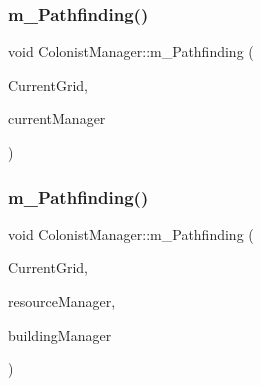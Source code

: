 \mbox{\label{class_colonist_manager_a4ae7bcfdb32a8862d950f36d357145dc}} 
\subsubsection{\texorpdfstring{m\+\_\+\+Pathfinding()}{m\_Pathfinding()}\hspace{0.1cm}{\footnotesize\ttfamily [1/2]}}
{\footnotesize\ttfamily void Colonist\+Manager\+::m\+\_\+\+Pathfinding (\begin{DoxyParamCaption}\item[{\mbox{\hyperlink{class_grid}{Grid}} \&}]{Current\+Grid,  }\item[{\mbox{\hyperlink{class_resource_management}{Resource\+Management}} \&}]{current\+Manager }\end{DoxyParamCaption})}

\mbox{\label{class_colonist_manager_a3c6476b726ac4ccf91be332be262810a}} 
\subsubsection{\texorpdfstring{m\+\_\+\+Pathfinding()}{m\_Pathfinding()}\hspace{0.1cm}{\footnotesize\ttfamily [2/2]}}
{\footnotesize\ttfamily void Colonist\+Manager\+::m\+\_\+\+Pathfinding (\begin{DoxyParamCaption}\item[{\mbox{\hyperlink{class_grid}{Grid}} \&}]{Current\+Grid,  }\item[{\mbox{\hyperlink{class_resource_management}{Resource\+Management}} \&}]{resource\+Manager,  }\item[{\mbox{\hyperlink{class_building_manager}{Building\+Manager}} \&}]{building\+Manager }\end{DoxyParamCaption})}

\mbox{\label{class_colonist_manager_a03bf090e3d6dc4f731daef7f91ea1f11}} 
